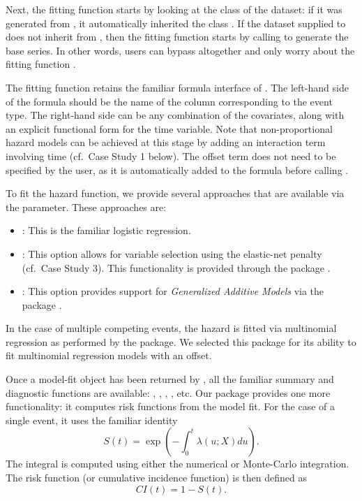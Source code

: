 Next, the fitting function  starts by looking at
the class of the dataset: if it was generated from
, it automatically inherited the class
. If the dataset supplied to  does
not inherit from , then the fitting function starts by
calling  to generate the base series. In other
words, users can bypass  altogether and only worry
about the fitting function .

The fitting function retains the familiar formula interface of
. The left-hand side of the formula should be the name of the
column corresponding to the event type. The right-hand side can be any
combination of the covariates, along with an explicit functional form
for the time variable. Note that non-proportional hazard models can be
achieved at this stage by adding an interaction term involving time
(cf.~Case Study 1 below). The offset term does not need to be specified
by the user, as it is automatically added to the formula before calling
.

To fit the hazard function, we provide several approaches that are
available via the  parameter. These approaches are:

\begin{itemize}
\tightlist
\item
  : This is the familiar logistic regression.
\item
  : This option allows for variable selection using the
  elastic-net \citep{zou2005regularization} penalty (cf.~Case Study 3).
  This functionality is provided through the  package
  \citep{friedman2010jss}.
\item
  : This option provides support for \emph{Generalized
  Additive Models} via the  package
  \citep{hastie1987generalized}.
\end{itemize}

In the case of multiple competing events, the hazard is fitted via
multinomial regression as performed by the  package. We
selected this package for its ability to fit multinomial regression
models with an offset.

Once a model-fit object has been returned by , all
the familiar summary and diagnostic functions are available:
, , , , etc. Our
package provides one more functionality: it computes risk functions from
the model fit. For the case of a single event, it uses the familiar
identity \begin{equation}\label{eqn:surv}
S(t) = \exp\left(-\int_0^t \lambda(u;X) du\right).
\end{equation} The integral is computed using either the numerical or
Monte-Carlo integration. The risk function (or cumulative incidence
function) is then defined as \begin{equation}\label{eqn:CI}
CI(t) = 1 - S(t).
\end{equation}

